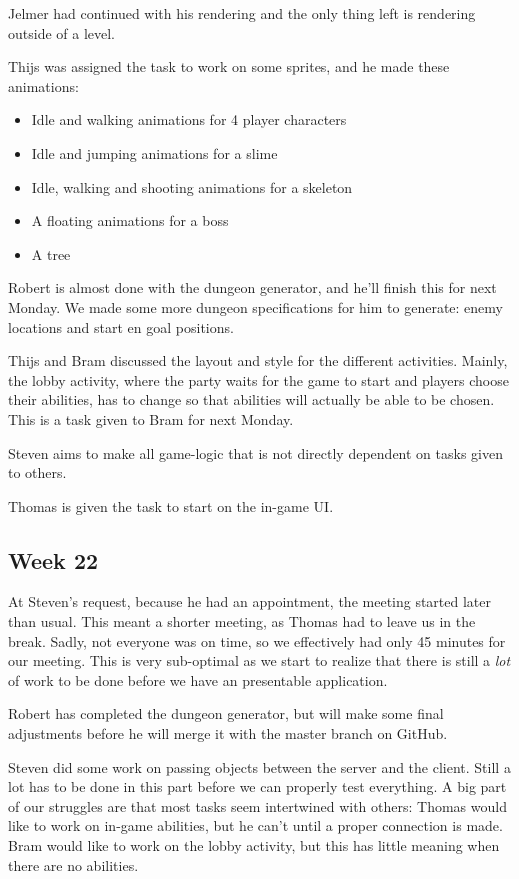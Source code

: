 \documentclass[../main.tex]{subfiles}
\begin{document}
Jelmer had continued with his rendering and the only thing left is rendering outside of a level. 

Thijs was assigned the task to work on some sprites, and he made these animations:
\begin{itemize}
	\item Idle and walking animations for 4 player characters
	\item Idle and jumping animations for a slime
	\item Idle, walking and shooting animations for a skeleton
	\item A floating animations for a boss
	\item A tree
\end{itemize}
Robert is almost done with the dungeon generator, and he'll finish this for next Monday. We made some more dungeon specifications for him to generate: enemy locations and start en goal positions.

Thijs and Bram discussed the layout and style for the different activities. Mainly, the lobby activity, where the party waits for the game to start and players choose their abilities, has to change so that abilities will actually be able to be chosen. This is a task given to Bram for next Monday. 

Steven aims to make all game-logic that is not directly dependent on tasks given to others. 

Thomas is given the task to start on the in-game UI. 


\subsection*{Week 22}
At Steven's request, because he had an appointment, the meeting started later than usual. This meant a shorter meeting, as Thomas had to leave us in the break. Sadly, not everyone was on time, so we effectively had only 45 minutes for our meeting. This is very sub-optimal as we start to realize that there is still a \textit{lot} of work to be done before we have an presentable application.

Robert has completed the dungeon generator, but will make some final adjustments before he will merge it with the master branch on GitHub. 

Steven did some work on passing objects between the server and the client. Still a lot has to be done in this part before we can properly test everything. A big part of our struggles are that most tasks seem intertwined with others: Thomas would like to work on in-game abilities, but he can't until a proper connection is made. Bram would like to work on the lobby activity, but this has little meaning when there are no abilities.
\end{document}
